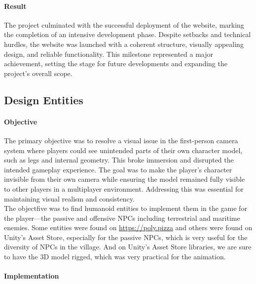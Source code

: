 \documentclass{article}
\begin{document}
\paragraph{Result}\hfill

The project culminated with the successful deployment of the website, marking the completion of an intensive development phase. Despite setbacks and technical hurdles, the website was launched with a coherent structure, visually appealing design, and reliable functionality. This milestone represented a major achievement, setting the stage for future developments and expanding the project's overall scope.










\newpage
\subsection{Design Entities}
\paragraph{Objective}\hfill

The primary objective was to resolve a visual issue in the first-person camera system where players could see unintended parts of their own character model, such as legs and internal geometry. This broke immersion and disrupted the intended gameplay experience. The goal was to make the player's character invisible from their own camera while ensuring the model remained fully visible to other players in a multiplayer environment. Addressing this was essential for maintaining visual realism and consistency.\\

The objectfive was to find humanoid entities to implement them in the game for the player—the passive and offensive NPCs including terrestrial and maritime enemies. Some entities were found on \url{https://poly.pizza} and others were found on Unity's Asset Store, especially for the passive NPCs, which is very useful for the diversity of NPCs in the village. And on Unity's Asset Store libraries, we are sure to have the 3D model rigged, which was very practical for the animation.

\paragraph{Implementation}\hfill
\end{document}
